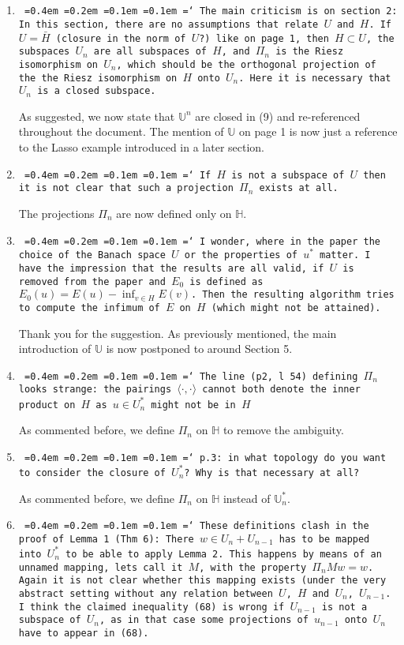 \documentclass[12pt]{article}
\newcommand*\justify{%
	\fontdimen2\font=0.4em%
	\fontdimen3\font=0.2em%
	\fontdimen4\font=0.1em%
	\fontdimen7\font=0.1em%
	\hyphenchar\font=`\-%
}
\newcommand{\review}[1]{\texttt{\justify{#1}}}
\newcommand{\F}[1]{\mathbb{#1}}
\begin{document}
\begin{enumerate}
	\item \review{The main criticism is on section 2: In this section, there are no assumptions that relate $U$ and $H$. If $U=\bar{H}$ (closure in the norm of $U$?) like on page 1, then $H\subset U$, the subspaces $U_n$ are all subspaces of $H$, and $\Pi_n$ is the Riesz isomorphism on $U_n$, which should be the orthogonal projection of the the Riesz isomorphism on $H$ onto $U_n$. Here it is necessary that $U_n$ is a closed subspace.}
	
	As suggested, we now state that $\F U^n$ are closed in (9) and re-referenced throughout the document. The mention of $\F U$ on page 1 is now just a reference to the Lasso example introduced in a later section.
	
	\item \review{If $H$ is not a subspace of $U$ then it is not clear that such a projection $\Pi_n$ exists at all.}
	
	The projections $\Pi_n$ are now defined only on $\F H$.
	
	\item \review{I wonder, where in the paper the choice of the Banach space $U$ or the properties of $u^*$ matter. I have the impression that the results are all valid, if $U$ is removed from the paper and $E_0$ is defined as $E_0(u)=E(u)-\inf_{v\in H}E(v)$. Then the resulting algorithm tries to compute the infimum of $E$ on $H$ (which might not be attained).}
	
	Thank you for the suggestion. As previously mentioned, the main introduction of $\F U$ is now postponed to around Section 5.
	
	\item \review{The line (p2, l 54) defining $\Pi_n$ looks strange: the pairings $\langle\cdot,\cdot\rangle$ cannot both denote the inner product on $H$ as $u\in U_n^*$ might not be in $H$}

	As commented before, we define $\Pi_n$ on $\F H$ to remove the ambiguity.
	
	\item \review{p.3: in what topology do you want to consider the closure of $U_n^*$? Why is that necessary at all?}
	
	As commented before, we define $\Pi_n$ on $\F H$ instead of $\F U_n^*$.	
	
	\item \review{These definitions clash in the proof of Lemma 1 (Thm 6): There $w\in U_n+U_{n-1}$ has to be mapped into $U_n^*$ to be able to apply Lemma 2. This happens by means of an unnamed mapping, lets call it $M$, with the property $\Pi_nMw=w$. Again it is not clear whether this mapping exists (under the very abstract setting without any relation between $U$, $H$ and $U_n$, $U_{n-1}$. I think the claimed inequality (68) is wrong if $U_{n-1}$ is not a subspace of $U_n$, as in that case some projections of $u_{n-1}$ onto $U_n$ have to appear in (68).}
	

\end{enumerate}
\end{document}
